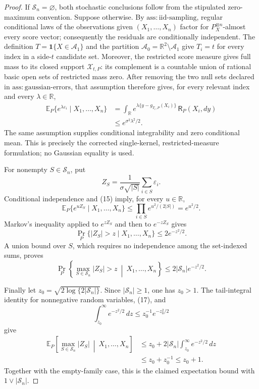 \documentclass{article}
\begin{document}
\begin{proof}
If \(\mathscr S_n=\varnothing\), both stochastic conclusions follow from the stipulated zero-maximum convention. Suppose otherwise. By \(\mathrm{ass:iid\text{-}sampling}\), regular conditional laws of the observations given \((X_1,\ldots,X_n)\) factor for \(P_X^{\otimes n}\)-almost every score vector; consequently the residuals are conditionally independent. The definition \(T=\mathbf 1\{X\in\mathcal A_1\}\) and the partition \(\mathcal A_0=\mathbb R^2\setminus\mathcal A_1\) give \(T_i=t\) for every index in a side-\(t\) candidate set. Moreover, the restricted score measure gives full mass to its closed support \(\mathcal X_{t,P}\): its complement is a countable union of rational basic open sets of restricted mass zero. After removing the two null sets declared in \(\mathrm{ass:gaussian\text{-}errors}\), that assumption therefore gives, for every relevant index and every \(\lambda\in\mathbb R\),
\[
 \begin{aligned}
 \mathbb E_P\{e^{\lambda\varepsilon_i}\mid X_1,\ldots,X_n\}
 &=\int_{\mathbb R}
 e^{\lambda\{y-g_{T_i,P}(X_i)\}}\,\mathsf R_P(X_i,dy)\\
 &\le e^{\sigma^2\lambda^2/2}.
 \end{aligned} \tag{15}
\]
The same assumption supplies conditional integrability and zero conditional mean. This is precisely the corrected single-kernel, restricted-measure formulation; no Gaussian equality is used.

For nonempty \(S\in\mathscr S_n\), put
\[
 Z_S=\frac1{\sigma\sqrt{|S|}}\sum_{i\in S}\varepsilon_i.
\]
Conditional independence and (15) imply, for every \(u\in\mathbb R\),
\[
 \mathbb E_P\{e^{uZ_S}\mid X_1,\ldots,X_n\}
 \le\prod_{i\in S}e^{u^2/(2|S|)}=e^{u^2/2}. \tag{16}
\]
Markov's inequality applied to \(e^{zZ_S}\) and then to \(e^{-zZ_S}\) gives
\[
 \Pr_P\{|Z_S|>z\mid X_1,\ldots,X_n\}\le2e^{-z^2/2}.
\]
A union bound over \(S\), which requires no independence among the set-indexed sums, proves
\[
 \Pr_P\left\{\max_{S\in\mathscr S_n}|Z_S|>z
 \ \middle|\ X_1,\ldots,X_n\right\}
 \le2|\mathscr S_n|e^{-z^2/2}. \tag{17}
\]

Finally let \(z_0=\sqrt{2\log\{2|\mathscr S_n|\}}\). Since \(|\mathscr S_n|\ge1\), one has \(z_0>1\). The tail-integral identity for nonnegative random variables, (17), and
\[
 \int_{z_0}^{\infty}e^{-z^2/2}\,dz\le z_0^{-1}e^{-z_0^2/2}
\]
give
\[
 \begin{aligned}
 \mathbb E_P\left[\max_{S\in\mathscr S_n}|Z_S|
 \ \middle|\ X_1,\ldots,X_n\right]
 &\le z_0+2|\mathscr S_n|\int_{z_0}^{\infty}e^{-z^2/2}\,dz\\
 &\le z_0+z_0^{-1}\le z_0+1.
 \end{aligned}
\]
Together with the empty-family case, this is the claimed expectation bound with \(1\vee|\mathscr S_n|\).
\end{proof}
\end{document}
